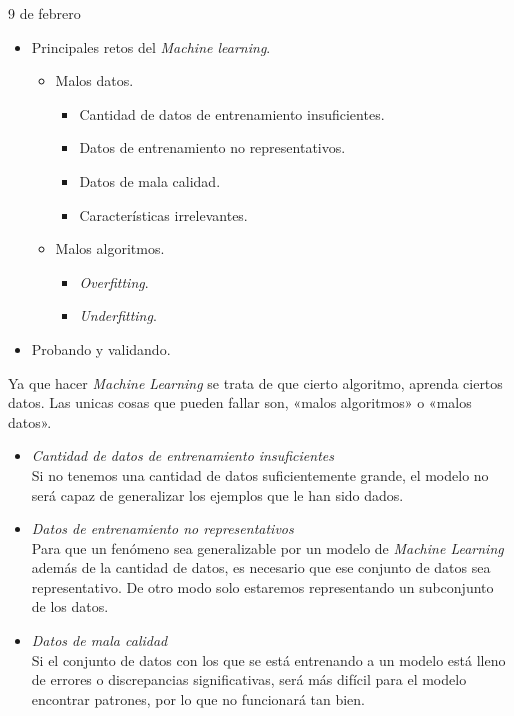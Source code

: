 \begin{entry}{9 de febrero}
\tcbsubtitle{\LBlimportant}
\begin{itemize}
    \item Principales retos del \textit{Machine learning}.
    \begin{itemize}
        \item Malos datos.
        \begin{itemize}
            \item Cantidad de datos de entrenamiento insuficientes.
            \item Datos de entrenamiento no representativos.
            \item Datos de mala calidad.
            \item Características irrelevantes.
        \end{itemize}
        \item Malos algoritmos.
        \begin{itemize}
            \item \textit{Overfitting}.
            \item \textit{Underfitting}.
        \end{itemize}
    \end{itemize}
    \item Probando y validando.
\end{itemize}
\tcblower
\tcbsubtitle{\LBlsummary}
Ya que hacer \textit{Machine Learning} se trata de que cierto algoritmo, aprenda ciertos datos. Las unicas cosas que pueden fallar son, «malos algoritmos» o «malos datos».
\begin{itemize}
    \item\textsl{Cantidad de datos de entrenamiento insuficientes}\\
    Si no tenemos una cantidad de datos suficientemente grande, el modelo no será capaz de generalizar los ejemplos que le han sido dados.
    
    \item\textsl{Datos de entrenamiento no representativos}\\
    Para que un fenómeno sea generalizable por un modelo de \textit{Machine Learning} además de la cantidad de datos, es necesario que ese conjunto de datos sea representativo. De otro modo solo estaremos representando un subconjunto de los datos.
    
    \item\textsl{Datos de mala calidad}\\
    Si el conjunto de datos con los que se está entrenando a un modelo está lleno de errores o discrepancias significativas, será más difícil para el modelo encontrar patrones, por lo que no funcionará tan bien.
    

\end{itemize}
\end{entry}
